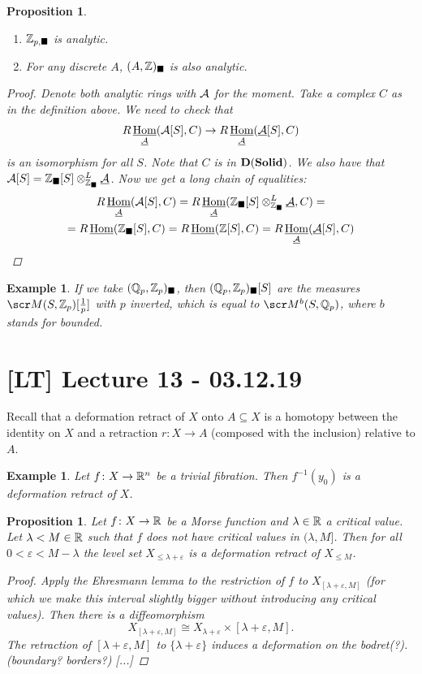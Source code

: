 \documentclass[A4paper, british, reqno]{amsart}
\theoremstyle{darkgreentheorem}
\newtheorem{prop}[thm]{Proposition}
\theoremstyle{darkbluedefinition}
\theoremstyle{darkredexample}
\newtheorem{exa}[thm]{Example}
\theoremstyle{remark}
\DeclareMathOperator{\ihom}{\underline{Hom}}
\newcommand{\Solid}{\mathbf{Solid}}
\newcommand{\1}{\mathbbm{1}}
\renewcommand{\u}[1]{\underline{#1}}
\newcommand{\ot}{\otimes}
\newcommand{\sub}{\subseteq}
\newcommand{\usolid}{_{\blacksquare}}
\begin{document}
\begin{prop}
    \begin{enumerate}[label=\roman*)]
	\item $\mathbb{Z}_{p,\blacksquare}$ is analytic.
	\item For any discrete $A$, $(A,\Z)\usolid$ is also analytic.
    \end{enumerate}
    \begin{proof}
	Denote both analytic rings with $\mathcal{A}$ for the moment.
	Take a complex $C$ as in the definition above.
	We need to check that
	\[ R\ihom_{\u{\calA}}(\calA[S],C)\to R\ihom_{\u{\calA}}(\u{\calA}[S],C) \]
	is an isomorphism for all $S$.
	Note that $C$ is in $\D(\Solid)$.
	We also have that $\calA[S]=\Z\usolid[S]\ot_{\Z\usolid}^{L}\u{\calA}$.
	Now we get a long chain of equalities:
	\begin{multline*}
	    R\ihom_{\u\calA}(\calA[S],C)=R\ihom_{\u{\calA}}(\Z\usolid[S]\ot_{\Z\usolid}^{L}\u{\calA},C)= \\
	    = R\ihom(\Z\usolid[S],C) = R\ihom(\Z[S],C)=R\ihom_{\u{\calA}}(\u{\calA}[S],C) 
	\end{multline*}
    \end{proof}
\end{prop}

\begin{exa}
    If we take $(\Q_{p},\Z_{p})\usolid$, then $(\Q_{p},\Z_{p})\usolid[S]$ are the measures $\M(S,\Z_{p})[\frac{1}{p}]$ with $p$ inverted, which is equal to $\M^{b}(S,\Q_{p})$, where $b$ stands for bounded.
\end{exa}

\section{[LT] Lecture 13 - 03.12.19}

Recall that a deformation retract of $X$ onto $A\sub X$ is a homotopy between the identity on $X$ and a retraction $r\colon X\to A$ (composed with the inclusion) relative to $A$.

\begin{exa}
    Let $f\colon X\to \mathbb{R}^{n}$ be a trivial fibration.
    Then $f^{-1}(y_{0})$ is a deformation retract of $X$.
\end{exa}

\begin{prop}
    Let $f\colon X\to \mathbb{R}$ be a Morse function and $\lambda\in \mathbb{R}$ a critical value.
    Let $\lambda<M\in \mathbb{R}$ such that $f$ does not have critical values in $(\lambda,M]$.
    Then for all $0<\varepsilon <M-\lambda$ the level set $X_{\leqslant \lambda +\varepsilon }$ is a deformation retract of $X_{\leqslant M}$.
    \begin{proof}
	Apply the Ehresmann lemma to the restriction of $f$ to $X_{[\lambda+\varepsilon, M]}$ (for which we make this interval slightly bigger without introducing any critical values).
	Then there is a diffeomorphism
	\[ X_{[\lambda+\varepsilon, M]}\cong X_{\lambda+\varepsilon}\times [\lambda+\varepsilon, M]. \]
	The retraction of $[\lambda+\varepsilon,M]$ to $\{\lambda +\varepsilon\}$ induces a deformation on the bodret(?).(boundary? borders?)
	[...]
    \end{proof}
\end{prop}
\end{document}
